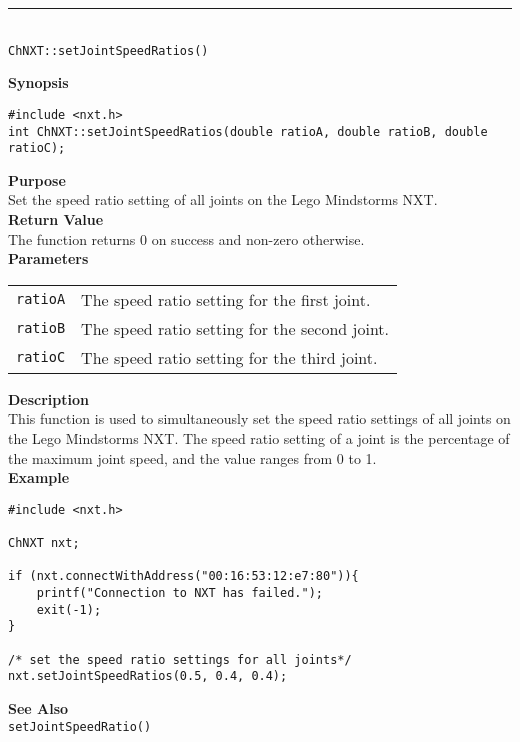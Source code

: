 \noindent
\vspace{5pt}
\rule{4.5in}{0.015in}\\
\noindent
{\LARGE \texttt{ChNXT::setJointSpeedRatios()} }\\


\noindent
{\bf Synopsis}
\begin{lstlisting}
#include <nxt.h>
int ChNXT::setJointSpeedRatios(double ratioA, double ratioB, double ratioC);
\end{lstlisting}

\noindent
{\bf Purpose}\\
Set the speed ratio setting of all joints on the Lego Mindstorms NXT.\\

\noindent
{\bf Return Value}\\
The function returns 0 on success and non-zero otherwise.\\

\noindent
{\bf Parameters}\\
\vspace{-0.1in}
\begin{description}
\item
\begin{tabular}{ p{20mm}p{135mm} }
\texttt{ratioA}&The speed ratio setting for the first joint.\\
\texttt{ratioB}&The speed ratio setting for the second joint.\\
\texttt{ratioC}&The speed ratio setting for the third joint.\\
\end{tabular}
\end{description}

\noindent
{\bf Description}\\
This function is used to simultaneously set the speed ratio settings 
of all joints on the Lego Mindstorms NXT. The speed ratio setting of
a joint is the percentage of the maximum joint speed, and the value 
ranges from 0 to 1.\\

\noindent
{\bf Example}
\begin{lstlisting}
#include <nxt.h> 

ChNXT nxt;

if (nxt.connectWithAddress("00:16:53:12:e7:80")){
    printf("Connection to NXT has failed.");
    exit(-1);
}
    
/* set the speed ratio settings for all joints*/
nxt.setJointSpeedRatios(0.5, 0.4, 0.4);
\end{lstlisting}

\noindent
{\bf See Also}\\
\texttt{setJointSpeedRatio()}\\
